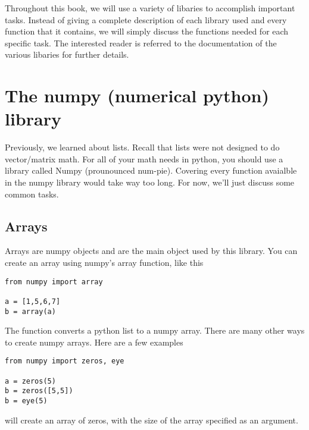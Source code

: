 Throughout this book, we will use a variety of libaries to accomplish
important tasks.  Instead of giving a complete description of each
library used and every function that it contains, we will simply
discuss the functions needed for each specific task.  The interested
reader is referred to the documentation of the various libaries for
further details.

\section{The numpy (numerical python) library}
Previously, we learned about lists.  Recall that lists were not
designed to do vector/matrix math.  For all of your math needs in
python, you should use a library called Numpy (prounounced num-pie).  Covering every function
avaialble in the numpy library would take way too long.  For now,
we'll just discuss some common tasks.

\subsection*{Arrays}
Arrays are numpy objects and are the main object used by this
library.  You can create an array using numpy's array function, like
this
\begin{Verbatim}
from numpy import array

a = [1,5,6,7]
b = array(a)     
\end{Verbatim}
The  function converts a python list to a numpy array.
There are many other ways to create numpy arrays.  Here are a few
examples
\begin{Verbatim}
from numpy import zeros, eye

a = zeros(5)
b = zeros([5,5])
b = eye(5)       
\end{Verbatim}

 will create an array of zeros, with the size of the
array specified as an argument.



